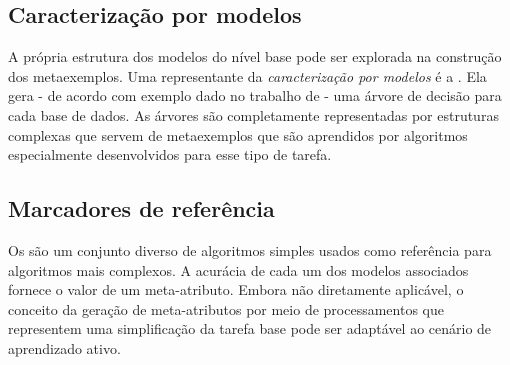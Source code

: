 \subsection{Caracterização por modelos}
A própria estrutura dos modelos do nível base pode ser explorada na construção dos
metaexemplos.
Uma representante da \textit{caracterização por modelos} é a
.
Ela gera - de acordo com exemplo dado no trabalho de
\cite{conf/ilp/BensusanGK00} - uma árvore de decisão para cada
base de dados.
As árvores são completamente representadas por estruturas complexas
que servem de metaexemplos que são aprendidos por algoritmos especialmente
desenvolvidos para esse tipo de tarefa.

\subsection{Marcadores de referência}
Os  \citep{pfahringer2000tell}
são um conjunto diverso de algoritmos simples usados como referência para
algoritmos mais complexos.
A acurácia de cada um dos modelos associados fornece o valor de um meta-atributo.
Embora não diretamente aplicável, o conceito da geração de meta-atributos por meio
de processamentos que representem uma simplificação da tarefa base pode
ser adaptável ao cenário de aprendizado ativo.

